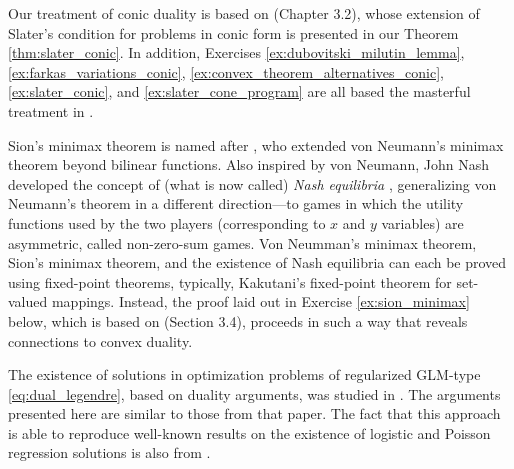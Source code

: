 Our treatment of conic duality is based on \cite{bental2023convex} (Chapter
3.2), whose extension of Slater's condition for problems in conic form is
presented in our Theorem \ref{thm:slater_conic}. In addition, Exercises
\ref{ex:dubovitski_milutin_lemma}, \ref{ex:farkas_variations_conic}, 
\ref{ex:convex_theorem_alternatives_conic}, \ref{ex:slater_conic}, and   
\ref{ex:slater_cone_program} are all based the masterful treatment in
\cite{bental2023convex}.  

Sion's minimax theorem is named after \cite{sion1958general}, who extended  
von Neumann's minimax theorem \cite{vonneumann1928theorie} beyond bilinear   
functions. Also inspired by von Neumann, John Nash developed the concept of
(what is now called) \emph{Nash equilibria} \cite{nash1950equilibrium,
  nash1951noncooperative}, generalizing von Neumann's theorem in a different   
direction---to games in which the utility functions used by the two players  
(corresponding to $x$ and $y$ variables) are asymmetric, called non-zero-sum
games. Von Neumman's minimax theorem, Sion's minimax theorem, and the existence
of Nash equilibria can each be proved using fixed-point theorems, typically,
Kakutani's fixed-point theorem \cite{kakutani1941generalization} for set-valued
mappings. Instead, the proof laid out in Exercise \ref{ex:sion_minimax} below, 
which is based on \cite{bental2023convex} (Section 3.4), proceeds in such a way
that reveals connections to convex duality.    

The existence of solutions in optimization problems of regularized GLM-type
\eqref{eq:dual_legendre}, based on duality arguments, was studied in
\cite{ali2019generalized}. The arguments presented here are similar to those
from that paper. The fact that this approach is able to reproduce well-known 
results on the existence of logistic and Poisson regression solutions
is also from \cite{ali2019generalized}.    

\clearpage

